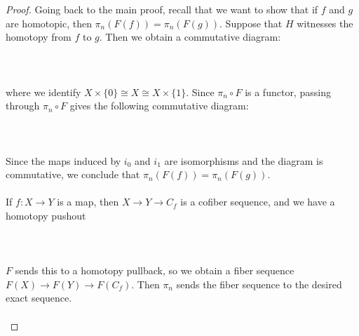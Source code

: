 \documentclass[a4paper]{article}
\begin{document}
\begin{thm}{}{}
\begin{proof}
Going back to the main proof, recall that we want to show that if $f$ and $g$ are homotopic, then $\pi_n(F(f))=\pi_n(F(g))$. Suppose that $H$ witnesses the homotopy from $f$ to $g$. Then we obtain a commutative diagram: \\~\\
\\~\\
where we identify $X\times\{0\}\cong X\cong X\times\{1\}$. Since $\pi_n\circ F$ is a functor, passing through $\pi_n\circ F$ gives the following commutative diagram: \\~\\
\\~\\
Since the maps induced by $i_0$ and $i_1$ are isomorphisms and the diagram is commutative, we conclude that $\pi_n(F(f))=\pi_n(F(g))$. \\~\\

If $f:X\to Y$ is a map, then $X\to Y\to C_f$ is a cofiber sequence, and we have a homotopy pushout \\~\\
\\~\\
$F$ sends this to a homotopy pullback, so we obtain a fiber sequence $F(X)\to F(Y)\to F(C_f)$. Then $\pi_n$ sends the fiber sequence to the desired exact sequence. \\~\\


\end{proof}
\end{thm}
\end{document}

